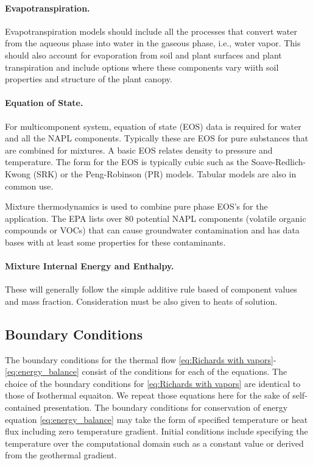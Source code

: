 \paragraph{Evapotranspiration. } 
%
Evapotranspiration models should include all the processes that convert water from the aqueous phase into water in the gaseous phase, 
i.e., water vapor.  
This should also account for evaporation from soil and plant surfaces and plant transpiration and include options 
where these components vary wiith soil properties and structure of the plant canopy.

\paragraph{Equation of State.}
%
For multicomponent system, equation of state (EOS) data is required for water and all the NAPL components.  
Typically these are EOS for pure substances that are combined for mixtures.  
A basic EOS relates density to pressure and temperature.  
The form for the EOS is typically cubic such as the Soave-Redlich-Kwong (SRK) or the
Peng-Robinson (PR) models.  
Tabular models are also in common use.

Mixture thermodynamics is used to combine pure phase EOS's for the application.  
The EPA lists over 80 potential NAPL components
(volatile organic compounds or VOCs) that can cause groundwater
contamination and has data bases with at least some properties for these
contaminants.


\paragraph{Mixture Internal Energy and Enthalpy.} 
%
These will generally follow the simple additive rule based of
component values and mass fraction. Consideration must be also given
to heats of solution.



\subsection{Boundary Conditions}

The boundary conditions for the thermal flow 
\eqref{eq:Richards with vapors}-\eqref{eq:energy_balance}
consist of the conditions for each of the equations.
The choice of the boundary conditions for \eqref{eq:Richards with vapors} are identical to those of Isothermal equaiton.
We repeat those equations here for the sake of self-contained presentation.
The boundary conditions for conservation of energy equation \eqref{eq:energy_balance}
may take the form of specified temperature or heat flux including zero temperature gradient. 
Initial conditions include specifying the temperature over the computational domain 
such as a constant value or derived from the geothermal gradient.


